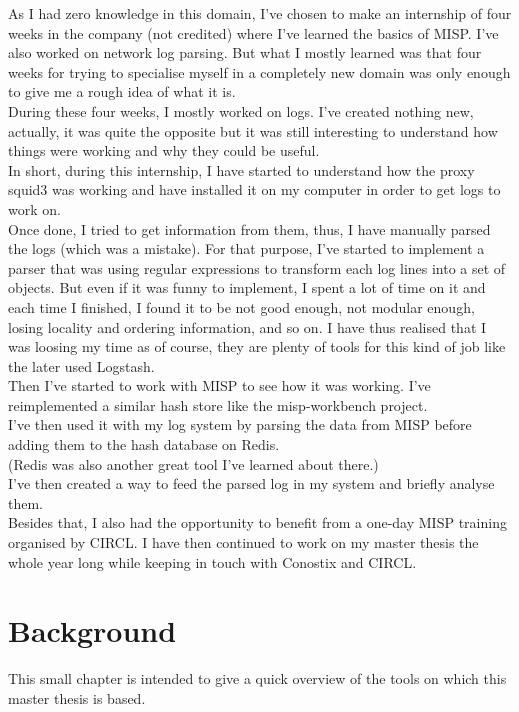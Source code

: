 \documentclass{eplmastersthesis}
\begin{document}
As I had zero knowledge in this domain, I've chosen to make an internship of four weeks in the company (not credited) where I've learned the basics of MISP. I've also worked on network log parsing. But what I mostly learned was that four weeks for trying to specialise myself in a completely new domain was only enough to give me a rough idea of what it is.\\
During these four weeks, I mostly worked on logs. I've created nothing new, actually, it was quite the opposite but it was still interesting to understand how things were working and why they could be useful. \\
In short, during this internship, I have started to understand how the proxy squid3 was working and have installed it on my computer in order to get logs to work on.\\
Once done, I tried to get information from them, thus, I have manually parsed the logs (which was a mistake). For that purpose, I've started to implement a parser that was using regular expressions to transform each log lines into a set of objects. But even if it was funny to implement, I spent a lot of time on it and each time I finished, I found it to be not good enough, not modular enough, losing locality and ordering information, and so on. I have thus realised that I was loosing my time as of course, they are plenty of tools for this kind of job like the later used Logstash.\\
Then I've started to work with MISP to see how it was working. I've reimplemented a similar hash store like the misp-workbench project.\\
I've then used it with my log system by parsing the data from MISP before adding them to the hash database on Redis.\\
(Redis was also another great tool I've learned about there.)\\
I've then created a way to feed the parsed log in my system and briefly analyse them.\\
Besides that, I also had the opportunity to benefit from a one-day MISP training organised by CIRCL.
I have then continued to work on my master thesis the whole year long while keeping in touch with Conostix and CIRCL.

\chapter{Background}
This small chapter is intended to give a quick overview of the tools on which this master thesis is based.
\end{document}
